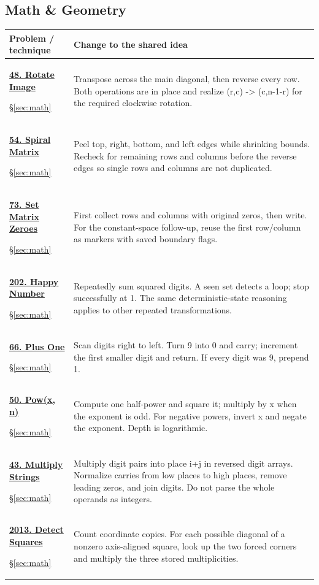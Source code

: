 \documentclass[11pt]{article}
\newcommand{\sect}[1]{\hyperref[sec:#1]{\S\ref*{sec:#1}}}
\begin{document}
\subsection{Math \& Geometry}
\begin{longtable}{@{}L{4.3cm}L{11.7cm}@{}}
\toprule Problem / technique & Change to the shared idea \\ \midrule\endhead
\hypertarget{lc48}{}\href{https://leetcode.com/problems/rotate-image/}{\textbf{48. Rotate Image}}\par\sect{math} & Transpose across the main diagonal, then reverse every row. Both operations are in place and realize (r,c) -> (c,n-1-r) for the required clockwise rotation.\\[4pt]
\hypertarget{lc54}{}\href{https://leetcode.com/problems/spiral-matrix/}{\textbf{54. Spiral Matrix}}\par\sect{math} & Peel top, right, bottom, and left edges while shrinking bounds. Recheck for remaining rows and columns before the reverse edges so single rows and columns are not duplicated.\\[4pt]
\hypertarget{lc73}{}\href{https://leetcode.com/problems/set-matrix-zeroes/}{\textbf{73. Set Matrix Zeroes}}\par\sect{math} & First collect rows and columns with original zeros, then write. For the constant-space follow-up, reuse the first row/column as markers with saved boundary flags.\\[4pt]
\hypertarget{lc202}{}\href{https://leetcode.com/problems/happy-number/}{\textbf{202. Happy Number}}\par\sect{math} & Repeatedly sum squared digits. A seen set detects a loop; stop successfully at 1. The same deterministic-state reasoning applies to other repeated transformations.\\[4pt]
\hypertarget{lc66}{}\href{https://leetcode.com/problems/plus-one/}{\textbf{66. Plus One}}\par\sect{math} & Scan digits right to left. Turn 9 into 0 and carry; increment the first smaller digit and return. If every digit was 9, prepend 1.\\[4pt]
\hypertarget{lc50}{}\href{https://leetcode.com/problems/powx-n/}{\textbf{50. Pow(x, n)}}\par\sect{math} & Compute one half-power and square it; multiply by x when the exponent is odd. For negative powers, invert x and negate the exponent. Depth is logarithmic.\\[4pt]
\hypertarget{lc43}{}\href{https://leetcode.com/problems/multiply-strings/}{\textbf{43. Multiply Strings}}\par\sect{math} & Multiply digit pairs into place i+j in reversed digit arrays. Normalize carries from low places to high places, remove leading zeros, and join digits. Do not parse the whole operands as integers.\\[4pt]
\hypertarget{lc2013}{}\href{https://leetcode.com/problems/detect-squares/}{\textbf{2013. Detect Squares}}\par\sect{math} & Count coordinate copies. For each possible diagonal of a nonzero axis-aligned square, look up the two forced corners and multiply the three stored multiplicities.\\[4pt]
\bottomrule
\end{longtable}
\end{document}
